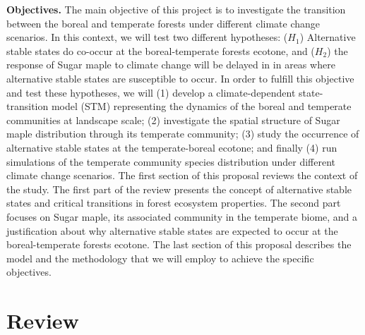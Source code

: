 \textbf{Objectives.} The main objective of this project is to investigate the
transition between the boreal and temperate forests under different climate
change scenarios. In this context, we will test two different hypotheses:
($H_1$) Alternative stable states do co-occur at the boreal-temperate forests
ecotone, and ($H_2$) the response of Sugar maple to climate change will be delayed in 
in areas where alternative stable states are susceptible to occur. In order to fulfill this
objective and test these hypotheses, we will (1) develop a climate-dependent 
state-transition model (STM) representing the dynamics of the
boreal and temperate communities at landscape scale; (2) investigate the
spatial structure of Sugar maple distribution through its temperate community; (3)
study the occurrence of alternative stable states at the temperate-boreal ecotone;
and finally (4) run simulations of the temperate community species
distribution under different climate change scenarios. The first section of
this proposal reviews the context of the study. The first part of the review
presents the concept of alternative stable states and critical transitions in
forest ecosystem properties. The second part focuses on Sugar maple, its
associated community in the temperate biome, and a justification about why
alternative stable states are expected to occur at the boreal-temperate
forests ecotone. The last section of this proposal describes the model and
the methodology that we will employ to achieve the specific objectives. 

\section{Review} 

